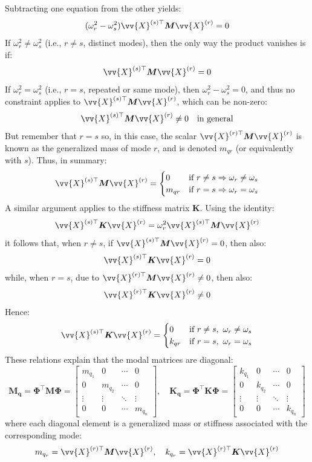 Subtracting one equation from the other yields:
\[
(\omega_r^2 - \omega_s^2) \vv{X}^{(s)\top} \boldsymbol{M} \vv{X}^{(r)} = 0
\]
If \( \omega_r^2 \neq \omega_s^2 \) (i.e., \( r \neq s \), distinct modes), then the only way the product vanishes is if:
\[
\vv{X}^{(s)\top} \boldsymbol{M} \vv{X}^{(r)} = 0
\]
If \( \omega_r^2 = \omega_s^2 \) (i.e., \( r = s \), repeated or same mode), then \( \omega_r^2 - \omega_s^2 = 0 \), and thus no constraint applies to \( \vv{X}^{(s)\top} \boldsymbol{M} \vv{X}^{(r)} \), which can be non-zero:
\[
\vv{X}^{(s)\top} \boldsymbol{M} \vv{X}^{(r)} \neq 0 \quad \text{in general}
\]
But remember that \( r = s \) so, in this case, the scalar \( \vv{X}^{(r)\top} \boldsymbol{M} \vv{X}^{(r)} \) is known as the generalized mass of mode \( r \), and is denoted \( m_{qr} \) (or equivalently with \( s \)). Thus, in summary:
\[
\vv{X}^{(s)\top} \boldsymbol{M} \vv{X}^{(r)} =
\begin{cases}
0 & \text{if } r \neq s \Rightarrow \omega_r \neq \omega_s \\
m_{qr} & \text{if } r = s \Rightarrow \omega_r = \omega_s
\end{cases}
\]
A similar argument applies to the stiffness matrix \( \boldsymbol{K} \). Using the identity:
\[
\vv{X}^{(s)\top} \boldsymbol{K} \vv{X}^{(r)} = \omega_r^2 \vv{X}^{(s)\top} \boldsymbol{M} \vv{X}^{(r)}
\]
it follows that, when \( r \neq s \), if \( \vv{X}^{(s)\top} \boldsymbol{M} \vv{X}^{(r)} = 0 \), then also:
\[
\vv{X}^{(s)\top} \boldsymbol{K} \vv{X}^{(r)} = 0
\]
while, when \( r = s \), due to \( \vv{X}^{(r)\top} \boldsymbol{M} \vv{X}^{(r)} \neq 0 \), then also:
\[
\vv{X}^{(r)\top} \boldsymbol{K} \vv{X}^{(r)} \neq 0
\]
Hence:
\[
\vv{X}^{(s)\top} \boldsymbol{K} \vv{X}^{(r)} =
\begin{cases}
0 & \text{if } r \neq s,\ \omega_r \neq \omega_s \\
k_{qr} & \text{if } r = s,\ \omega_r = \omega_s
\end{cases}
\]
These relations explain that the modal matrices are diagonal:
\[
\boldsymbol{M_q} = \boldsymbol{\Phi}^\top \boldsymbol{M} \boldsymbol{\Phi}
= \begin{bmatrix}
m_{q_1} & 0 & \cdots & 0 \\
0 & m_{q_2} & \cdots & 0 \\
\vdots & \vdots & \ddots & \vdots \\
0 & 0 & \cdots & m_{q_n}
\end{bmatrix}, \quad
\boldsymbol{K_q} = \boldsymbol{\Phi}^\top \boldsymbol{K} \boldsymbol{\Phi}
= \begin{bmatrix}
k_{q_1} & 0 & \cdots & 0 \\
0 & k_{q_2} & \cdots & 0 \\
\vdots & \vdots & \ddots & \vdots \\
0 & 0 & \cdots & k_{q_n}
\end{bmatrix}
\]
where each diagonal element is a generalized mass or stiffness associated with the corresponding mode:
\[
m_{q_r} = \vv{X}^{(r)\top} \boldsymbol{M} \vv{X}^{(r)}, \quad
k_{q_r} = \vv{X}^{(r)\top} \boldsymbol{K} \vv{X}^{(r)}
\]

